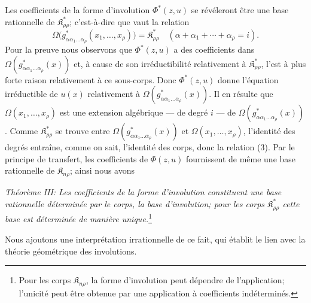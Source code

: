 \documentclass[11pt]{article}
\providecommand{\Kfield}{\mathfrak{K}}
\begin{document}
Les coefficients de la forme d'involution $\Phi^*(z,u)$ se révéleront être une base rationnelle de $\Kfield^*_{\rho\rho}$; c'est-à-dire que vaut la relation
\begin{equation}
  \Omega\bigl(g^*_{\alpha\alpha_1\ldots\alpha_\rho}(x_1,
  \ldots,x_\rho)\bigr)=\Kfield^*_{\rho\rho}
  \quad(\alpha+\alpha_1+\cdots+\alpha_\rho=i).
\tag{3}
\end{equation}
Pour la preuve nous observons que $\Phi^*(z,u)$ a des coefficients dans $\Omega(g^*_{\alpha\alpha_1\ldots\alpha_\rho}(x))$ et, à cause de son irréductibilité relativement à $\Kfield^*_{\rho\rho}$, l'est à plus forte raison relativement à ce sous-corps. Donc $\Phi^*(z,u)$ donne l'équation irréductible de $u(x)$ relativement à $\Omega(g^*_{\alpha\alpha_1\ldots\alpha_\rho}(x))$. Il en résulte que $\Omega(x_1,\ldots,x_\rho)$ est une extension algébrique --- de degré $i$ --- de $\Omega(g^*_{\alpha\alpha_1\ldots\alpha_\rho}(x))$. Comme $\Kfield^*_{\rho\rho}$ se trouve entre $\Omega(g^*_{\alpha\alpha_1\ldots\alpha_\rho}(x))$ et $\Omega(x_1,\ldots,x_\rho)$, l'identité des degrés entraîne, comme on sait, l'identité des corps, donc la relation (3). Par le principe de transfert, les coefficients de $\Phi(z,u)$ fournissent de même une base rationnelle de $\Kfield_{n\rho}$; ainsi nous avons

\emph{Théorème III: Les coefficients de la forme d'involution constituent une base rationnelle déterminée par le corps, la base d'involution; pour les corps $\Kfield^*_{\rho\rho}$ cette base est déterminée de manière unique.}\footnote{Pour les corps $\Kfield_{n\rho}$, la forme d'involution peut dépendre de l'application; l'unicité peut être obtenue par une application à coefficients indéterminés.}

Nous ajoutons une interprétation irrationnelle de ce fait, qui établit le lien avec la théorie géométrique des involutions.
\end{document}
